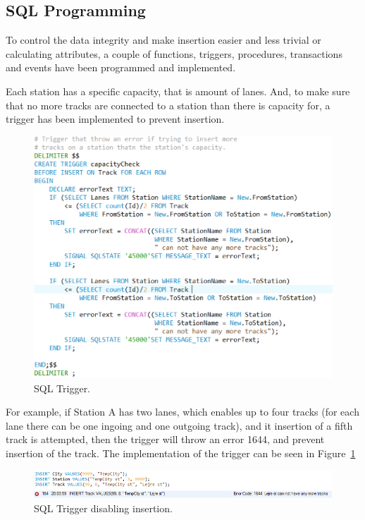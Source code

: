 \subsection{SQL Programming} \label{sec:sql:programming}
To control the data integrity and make insertion easier and less trivial or 
calculating attributes, a couple of functions, triggers, procedures, 
transactions and events have been programmed and implemented.

Each station has a specific capacity, that is amount of lanes. And, to make 
sure that no more tracks are connected to a station than there is capacity for, 
a trigger has been implemented to prevent insertion.

\begin{figure}[h]
    \centering
    \includegraphics[scale=.75]{img/SQL_TRIGGER}
    \caption{SQL Trigger.}
    \label{fig:trigger}
\end{figure}

For example, if Station A has two lanes, which enables up to four tracks (for 
each lane there can be one ingoing and one outgoing track), and it insertion of 
a fifth track is attempted, then the trigger will throw an error 1644, and 
prevent insertion of the track. The implementation of the trigger can be seen 
in Figure~\ref{fig:trigger}

\begin{figure}[h]
    \centering
    \includegraphics[width=\textwidth]{img/SQL_TRIGGER_example}
    \caption{SQL Trigger disabling insertion.}
    \label{fig:trigger2}
\end{figure}

